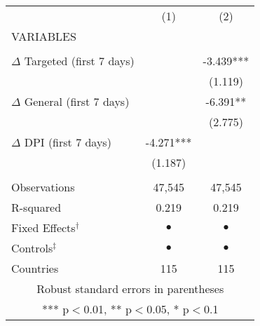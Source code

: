 \begin{tabular}{lcc} \hline
 & (1) & (2) \\
VARIABLES &  &  \\ \hline
 &  &  \\
$\Delta$ Targeted (first 7 days) &  & -3.439*** \\
 &  & (1.119) \\
$\Delta$ General (first 7 days) &  & -6.391** \\
 &  & (2.775) \\
$\Delta$ DPI (first 7 days) & -4.271*** &  \\
 & (1.187) &  \\
 &  &  \\
Observations & 47,545 & 47,545 \\
R-squared & 0.219 & 0.219 \\
Fixed Effects$^\dag$ & $ \bullet $ & $ \bullet $ \\
Controls$^\ddag$ & $ \bullet $ & $ \bullet $ \\
 Countries & 115 & 115 \\ \hline
\multicolumn{3}{c}{ Robust standard errors in parentheses} \\
\multicolumn{3}{c}{ *** p$<$0.01, ** p$<$0.05, * p$<$0.1} \\
\end{tabular}
